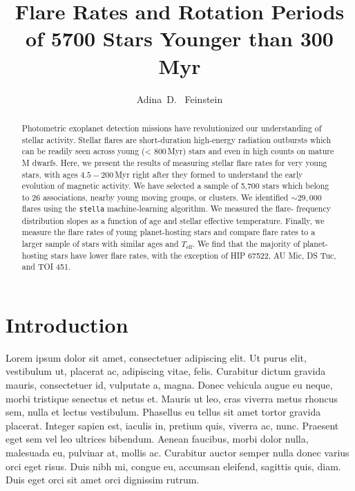 \documentclass[twocolumn]{aastex631}
\begin{document}
\title{Flare Rates and Rotation Periods of 5700 Stars Younger than 300 Myr}

\author{Adina~D.~ Feinstein}

\begin{abstract}
    Photometric exoplanet detection missions have revolutionized our understanding
    of stellar activity. Stellar flares are short-duration high-energy radiation
    outbursts which can be readily seen across young (< 800\,Myr) stars and even
    in high counts on mature M dwarfs. Here, we present the results of measuring
    stellar flare rates for very young stars, with ages $4.5 - 200$\,Myr right
    after they formed to understand the early evolution of magnetic activity. We
    have selected a sample of 5,700 stars which belong to 26 associations,
    nearby young moving groups, or clusters. We identified $\sim 29,000$ flares
    using the \texttt{stella} machine-learning algorithm. We measured the flare-
    frequency distribution slopes as a function of age and stellar effective
    temperature. Finally, we measure the flare rates of young planet-hosting stars and
    compare flare rates to a larger sample of stars with similar ages and $T_\textrm{eff}$.
    We find that the majority of planet-hosting stars have lower flare rates, with the exception of
    HIP 67522, AU Mic, DS Tuc, and TOI 451.
\end{abstract}

\section{Introduction}
\label{sec:intro}

Lorem ipsum dolor sit amet, consectetuer adipiscing elit.
Ut purus elit, vestibulum ut, placerat ac, adipiscing vitae, felis.
Curabitur dictum gravida mauris, consectetuer id, vulputate a, magna.
Donec vehicula augue eu neque, morbi tristique senectus et netus et.
Mauris ut leo, cras viverra metus rhoncus sem, nulla et lectus vestibulum.
Phasellus eu tellus sit amet tortor gravida placerat.
Integer sapien est, iaculis in, pretium quis, viverra ac, nunc.
Praesent eget sem vel leo ultrices bibendum.
Aenean faucibus, morbi dolor nulla, malesuada eu, pulvinar at, mollis ac.
Curabitur auctor semper nulla donec varius orci eget risus.
Duis nibh mi, congue eu, accumsan eleifend, sagittis quis, diam.
Duis eget orci sit amet orci dignissim rutrum.
\end{document}
